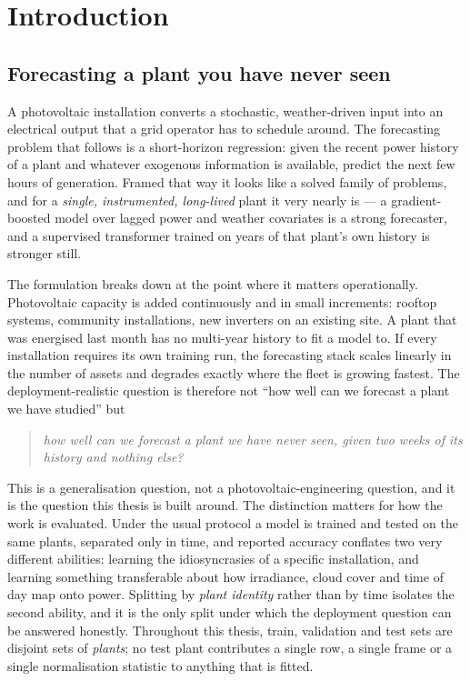 \chapter{Introduction}
\label{cha:intro}

\section{Forecasting a plant you have never seen}
\label{sec:motivation}

A photovoltaic installation converts a stochastic, weather-driven input into an
electrical output that a grid operator has to schedule around. The forecasting problem
that follows is a short-horizon regression: given the recent power history of a plant and
whatever exogenous information is available, predict the next few hours of generation.
Framed that way it looks like a solved family of problems, and for a \emph{single,
instrumented, long-lived} plant it very nearly is --- a gradient-boosted model over lagged
power and weather covariates is a strong forecaster, and a supervised transformer trained
on years of that plant's own history is stronger still.

The formulation breaks down at the point where it matters operationally. Photovoltaic
capacity is added continuously and in small increments: rooftop systems, community
installations, new inverters on an existing site. A plant that was energised last month has
no multi-year history to fit a model to. If every installation requires its own training
run, the forecasting stack scales linearly in the number of assets and degrades exactly
where the fleet is growing fastest. The deployment-realistic question is therefore not
``how well can we forecast a plant we have studied'' but

\begin{quote}
  \emph{how well can we forecast a plant we have never seen, given two weeks of its history
  and nothing else?}
\end{quote}

This is a generalisation question, not a photovoltaic-engineering question, and it is the
question this thesis is built around. The distinction matters for how the work is
evaluated. Under the usual protocol a model is trained and tested on the same plants,
separated only in time, and reported accuracy conflates two very different abilities:
learning the idiosyncrasies of a specific installation, and learning something transferable
about how irradiance, cloud cover and time of day map onto power. Splitting by \emph{plant
identity} rather than by time isolates the second ability, and it is the only split under
which the deployment question can be answered honestly. Throughout this thesis, train,
validation and test sets are disjoint sets of \emph{plants}; no test plant contributes a
single row, a single frame or a single normalisation statistic to anything that is fitted.

